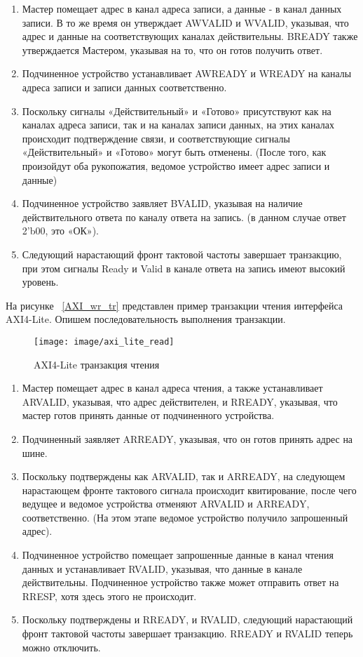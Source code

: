 \begin{enumerate}
	\item Мастер помещает адрес в канал адреса записи, а данные - в канал данных записи. В то же время он утверждает AWVALID и WVALID, указывая, что адрес и данные на соответствующих каналах действительны. BREADY также утверждается Мастером, указывая на то, что он готов получить ответ.
	\item Подчиненное устройство устанавливает AWREADY и WREADY на каналы адреса записи и записи данных соответственно.
	\item Поскольку сигналы «Действительный» и «Готово» присутствуют как на каналах адреса записи, так и на каналах записи данных, на этих каналах происходит подтверждение связи, и соответствующие сигналы «Действительный» и «Готово» могут быть отменены. (После того, как произойдут оба рукопожатия, ведомое устройство имеет адрес записи и данные)
	\item Подчиненное устройство заявляет BVALID, указывая на наличие действительного ответа по каналу ответа на запись. (в данном случае ответ 2'b00, это «ОК»).
	\item Следующий нарастающий фронт тактовой частоты завершает транзакцию, при этом сигналы Ready и Valid в канале ответа на запись имеют высокий уровень.
\end{enumerate}

На рисунке ~\ref{AXI_wr_tr} представлен пример транзакции чтения интерфейса AXI4-Lite.
Опишем последовательность выполнения транзакции.

\begin{figure}[h]
	\centering
	\texttt{[image: image/axi\_lite\_read]}
	\caption{AXI4-Lite транзакция чтения}
	\label{AXI_rd_tr}
\end{figure}

\begin{enumerate}
	\item Мастер помещает адрес в канал адреса чтения, а также устанавливает ARVALID, указывая, что адрес действителен, и RREADY, указывая, что мастер готов принять данные от подчиненного устройства.
	\item Подчиненный заявляет ARREADY, указывая, что он готов принять адрес на шине.
	\item Поскольку подтверждены как ARVALID, так и ARREADY, на следующем нарастающем фронте тактового сигнала происходит квитирование, после чего ведущее и ведомое устройства отменяют ARVALID и ARREADY, соответственно. (На этом этапе ведомое устройство получило запрошенный адрес).
	\item Подчиненное устройство помещает запрошенные данные в канал чтения данных и устанавливает RVALID, указывая, что данные в канале действительны. Подчиненное устройство также может отправить ответ на RRESP, хотя здесь этого не происходит.
	\item Поскольку подтверждены и RREADY, и RVALID, следующий нарастающий фронт тактовой частоты завершает транзакцию. RREADY и RVALID теперь можно отключить.
\end{enumerate}

